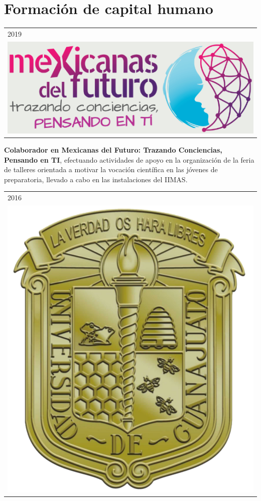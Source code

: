 \documentclass[]{friggeri-cv}
\begin{document}
\section{Formación de capital humano}
\begin{entrylist}
    \entry
     {   \begin{tabular}{l}
    		\hspace{0.9cm}2019\\
     		\includegraphics[scale=0.15]{img/mexicanas.png}
	\end{tabular}
    }
    {\vspace{-0.99cm}}
    { }
    {\textbf{Colaborador en Mexicanas del Futuro: Trazando Conciencias, Pensando en TI}, efectuando actividades de apoyo en la organización de la feria de talleres orientada a motivar la vocación científica en las jóvenes de preparatoria, llevado a cabo en las instalaciones del IIMAS.}
 \entry
    {   \begin{tabular}{l}
    		\hspace{0.8cm}2016\\
     		\hspace{0.4cm}\includegraphics[scale=0.5]{img/UGTO.png}

\end{tabular}}
\end{entrylist}
\end{document}
